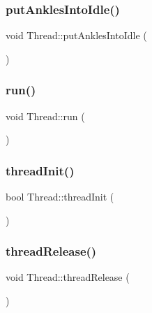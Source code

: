 \hypertarget{classThread_a49b65da88eb521ff53ef94d6ec8da7ab}{}\label{classThread_a49b65da88eb521ff53ef94d6ec8da7ab} 
\subsubsection{\texorpdfstring{put\+Ankles\+Into\+Idle()}{putAnklesIntoIdle()}}
{\footnotesize\ttfamily void Thread\+::put\+Ankles\+Into\+Idle (\begin{DoxyParamCaption}{ }\end{DoxyParamCaption})\hspace{0.3cm}{\ttfamily [private]}}

\hypertarget{classThread_ad9373d8d725c46717dfce3130018fe3a}{}\label{classThread_ad9373d8d725c46717dfce3130018fe3a} 
\subsubsection{\texorpdfstring{run()}{run()}}
{\footnotesize\ttfamily void Thread\+::run (\begin{DoxyParamCaption}{ }\end{DoxyParamCaption})}

\hypertarget{classThread_a1e840470cd71d7bfb2430d24169e3dce}{}\label{classThread_a1e840470cd71d7bfb2430d24169e3dce} 
\subsubsection{\texorpdfstring{thread\+Init()}{threadInit()}}
{\footnotesize\ttfamily bool Thread\+::thread\+Init (\begin{DoxyParamCaption}{ }\end{DoxyParamCaption})}

\hypertarget{classThread_aa2856c7d45670f45d66bcb319255defe}{}\label{classThread_aa2856c7d45670f45d66bcb319255defe} 
\subsubsection{\texorpdfstring{thread\+Release()}{threadRelease()}}
{\footnotesize\ttfamily void Thread\+::thread\+Release (\begin{DoxyParamCaption}{ }\end{DoxyParamCaption})}

